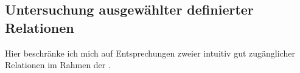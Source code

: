     
 \subsection{Untersuchung ausgewählter definierter Relationen}



    Hier beschränke ich mich auf Entsprechungen zweier intuitiv gut zugänglicher Relationen im Rahmen der \strukt.

